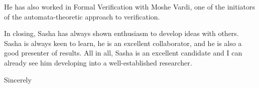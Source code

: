 \documentclass{letter}
\begin{document}
\begin{letter}{}
He has also worked in Formal Verification with Moshe Vardi, one of the initiators of the automata-theoretic approach to verification.

In closing, Sasha has always shown enthusiasm to develop ideas with others. Sasha is always keen to learn, he is an excellent collaborator, and he is also a good presenter of results. All in all, Sasha is an excellent candidate and I can already see him developing into a well-established researcher.

\closing{Sincerely} \end{letter}
\end{document}
